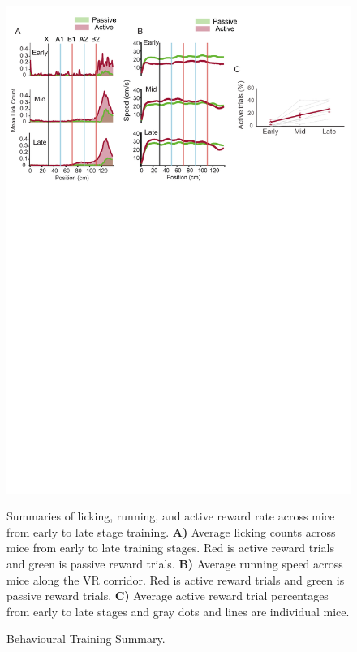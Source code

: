 \begin{figure}
    \centering
    \includegraphics[width=1\linewidth]{figures//Chapter 3 Behaviour//Thesis Figures//figure_PDFs/fig3_behavioural_learning_summary.pdf}
    \caption{Behavioural Training Summary. }
\medskip
\small
Summaries of licking, running, and active reward rate across mice from early to late stage training. \textbf{A)} Average licking counts across mice from early to late training stages. Red is active reward trials and green is passive reward trials. \textbf{B)} Average running speed across mice along the VR corridor. Red is active reward trials and green is passive reward trials. \textbf{C)} Average active reward trial percentages from early to late stages and gray dots and lines are individual mice.
    \label{fig:training behaviour summary}
\end{figure}








